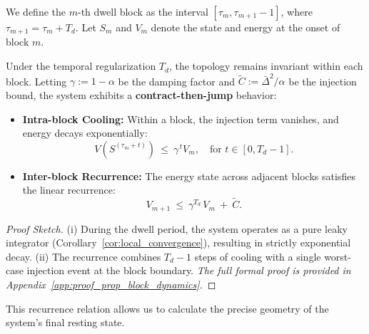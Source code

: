 \documentclass{ccjnl}
\begin{document}
We define the $m$-th dwell block as the interval $[\tau_m, \tau_{m+1}-1]$, where $\tau_{m+1} = \tau_m + T_d$. 
Let $S_m$ and $V_m$ denote the state and energy at the onset of block $m$.

\begin{proposition}
\label{prop:block_dynamics}
Under the temporal regularization $T_d$, the topology remains invariant within each block. 
Letting $\gamma:=1-\alpha$ be the damping factor and $\tilde C:=\bar\Delta^2/\alpha$ be the injection bound, the system exhibits a \textbf{contract-then-jump} behavior:
\begin{itemize}
    \item[\textit{(i)}] \textbf{Intra-block Cooling:} Within a block, the injection term vanishes, and energy decays exponentially:
    \begin{equation}\label{eq:intra_block}
    V(S^{(\tau_m+t)})\ \le\ \gamma^{\,t}V_m, \quad \text{for } t \in [0, T_d-1].
    \end{equation}
    \item[\textit{(ii)}] \textbf{Inter-block Recurrence:} The energy state across adjacent blocks satisfies the linear recurrence:
    \begin{equation}\label{eq:inter_block}
    V_{m+1}\ \le\ \gamma^{T_d}\,V_m\ +\ \tilde C.
    \end{equation}
\end{itemize}
\end{proposition}
\begin{proof}[Proof Sketch]
(i) During the dwell period, the system operates as a pure leaky integrator (Corollary~\ref{cor:local_convergence}), resulting in strictly exponential decay. (ii) The recurrence combines $T_d-1$ steps of cooling with a single worst-case injection event at the block boundary. \textit{The full formal proof is provided in Appendix~\ref{app:proof_prop_block_dynamics}.}
\end{proof}

This recurrence relation allows us to calculate the precise geometry of the system's final resting state.
\end{document}
